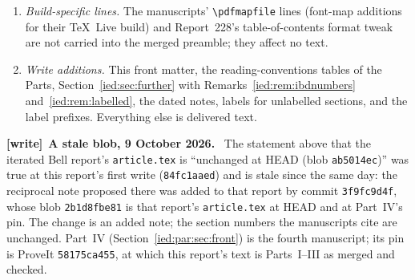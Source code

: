 \documentclass[11pt,letterpaper]{article}
\theoremstyle{remark}\newtheorem{remark}[theorem]{Remark}
\newcommand{\file}[1]{\nolinkurl{#1}}
\newenvironment{writenote}[1][]{\par\smallskip\begingroup\small
 \noindent\textbf{[write]}\if\relax\detokenize{#1}\relax\else~\textbf{#1.}\fi\ }%
 {\par\endgroup\smallskip}
\begin{document}
\begin{enumerate}
\item \emph{Build-specific lines.} The manuscripts' \texttt{\textbackslash pdfmapfile} lines (font-map additions for their TeX~Live build) and Report~228's table-of-contents format tweak are not carried into the merged preamble; they affect no text.
\item \emph{Write additions.} This front matter, the reading-conventions tables of the Parts, Section~\ref{ied:sec:further} with Remarks~\ref{ied:rem:ibdnumbers} and~\ref{ied:rem:labelled}, the dated notes, labels for unlabelled sections, and the label prefixes. Everything else is delivered text.
\end{enumerate}

\begin{writenote}[A stale blob, 9 October 2026]
The statement above that the iterated Bell report's \file{article.tex} is
``unchanged at HEAD (blob \texttt{ab5014ec})'' was true at this report's first
write (\file{84fc1aaed}) and is stale since the same day: the reciprocal note
proposed there was added to that report by commit \file{3f9fc9d4f}, whose blob
\file{2b1d8fbe81} is that report's \file{article.tex} at HEAD and at Part~IV's
pin. The change is an added note; the section numbers the manuscripts cite are
unchanged. Part~IV (Section~\ref{ied:par:sec:front}) is the fourth manuscript;
its pin is ProveIt \file{58175ca455}, at which this report's text is Parts~I--III
as merged and checked.
\end{writenote}
\end{document}
